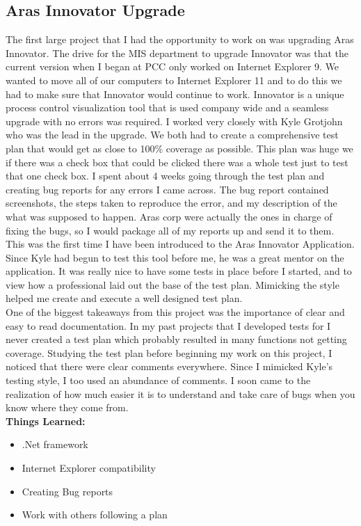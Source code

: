 \documentclass[letterpaper,10pt,notitlepage,fleqn]{article}
\begin{document}
\subsection{Aras Innovator Upgrade}
\indent The first large project that I had the opportunity to work on was upgrading 
Aras Innovator. The drive for the MIS department to upgrade Innovator was that the 
current version when I began at PCC only worked on Internet Explorer 9. We wanted 
to move all of our computers to Internet Explorer 11 and to do this we had to make 
sure that Innovator would continue to work. Innovator is a unique process control 
visualization tool that is used company wide and a seamless upgrade with no errors
was required. I worked very closely with Kyle Grotjohn who was the lead in the 
upgrade. We both had to create a comprehensive test plan that would get as close 
to 100\% coverage as possible. This plan was huge we if there was a check box that 
could be clicked there was a whole test just to test that one check box. I spent 
about 4 weeks going through the test plan and creating bug reports for any errors 
I came across. The bug report contained screenshots, the steps taken to reproduce 
the error, and my description of the what was supposed to happen. Aras corp were 
actually the ones in charge of fixing the bugs, so I would package all of my 
reports up and send it to them. 
\\
\indent This was the first time I have been introduced to the Aras Innovator Application. 
Since Kyle had begun to test this tool before me, he was a great mentor on the application. 
It was really nice to have some tests in place before I started, and to view how a professional
laid out the base of the test plan. Mimicking the style helped me create and execute 
a well designed test plan.
\\
\indent One of the biggest takeaways from this project was the importance of clear 
and easy to read documentation. In my past projects that I developed tests for I 
never created a test plan which probably resulted in many functions not getting coverage.
Studying the test plan before beginning my work on this project, I noticed that 
there were clear comments everywhere. Since I mimicked Kyle's testing style, I too 
used an abundance of comments. I soon came to the realization of how much easier 
it is to understand and take care of bugs when you know where they come from. \\


\textbf{Things Learned:}
\begin{itemize} 
        \item .Net framework
        \item Internet Explorer compatibility
        \item Creating Bug reports
        \item Work with others following a plan
    \end{itemize}
\end{document}
